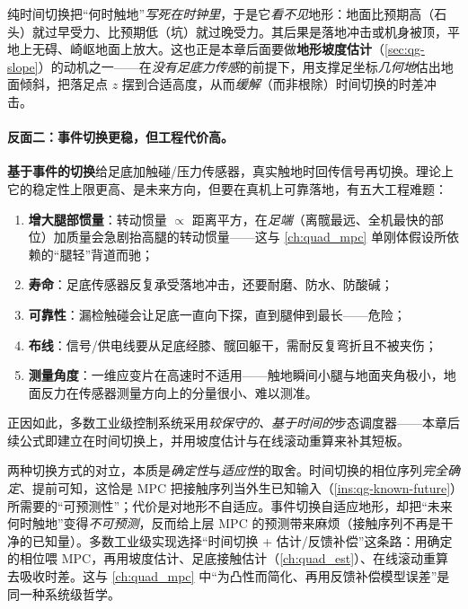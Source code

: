 \begin{pitfall}\label{pit:qg-time-switch}
纯时间切换把“何时触地”\emph{写死在时钟里}，于是它\emph{看不见}地形：地面比预期高（石头）就过早受力、比预期低（坑）就过晚受力。其后果是落地冲击或机身被顶，平地上无碍、崎岖地面上放大。这也正是本章后面要做\textbf{地形坡度估计}（\cref{sec:qg-slope}）的动机之一——在\emph{没有足底力传感}的前提下，用支撑足坐标\emph{几何地}估出地面倾斜，把落足点 $z$ 摆到合适高度，从而\emph{缓解}（而非根除）时间切换的时差冲击。
\end{pitfall}

\paragraph{反面二：事件切换更稳，但工程代价高。}
\textbf{基于事件的切换}给足底加触碰/压力传感器，真实触地时回传信号再切换。理论上它的稳定性上限更高、是未来方向，但要在真机上可靠落地，有五大工程难题\cite{yu2021quadruped}：
\begin{enumerate}
  \item \textbf{增大腿部惯量}：转动惯量 $\propto$ 距离平方，在\emph{足端}（离髋最远、全机最快的部位）加质量会急剧抬高腿的转动惯量——这与 \cref{ch:quad_mpc} 单刚体假设所依赖的“腿轻”背道而驰；
  \item \textbf{寿命}：足底传感器反复承受落地冲击，还要耐磨、防水、防酸碱；
  \item \textbf{可靠性}：漏检触碰会让足底一直向下探，直到腿伸到最长——危险；
  \item \textbf{布线}：信号/供电线要从足底经膝、髋回躯干，需耐反复弯折且不被夹伤；
  \item \textbf{测量角度}：一维应变片在高速时不适用——触地瞬间小腿与地面夹角极小，地面反力在传感器测量方向上的分量很小、难以测准。
\end{enumerate}
正因如此，多数工业级控制系统采用\emph{较保守的、基于时间的}步态调度器\cite{yu2021quadruped}——本章后续公式即建立在时间切换上，并用坡度估计与在线滚动重算来补其短板。

\begin{insight}\label{ins:qg-time-vs-event}
两种切换方式的对立，本质是\emph{确定性}与\emph{适应性}的取舍。时间切换的相位序列\emph{完全确定}、提前可知，这恰是 MPC 把接触序列当外生已知输入（\cref{ins:qg-known-future}）所需要的“可预测性”；代价是对地形不自适应。事件切换自适应地形，却把“未来何时触地”变得\emph{不可预测}，反而给上层 MPC 的预测带来麻烦（接触序列不再是干净的已知量）。多数工业级实现选择“时间切换 + 估计/反馈补偿”这条路：用确定的相位喂 MPC，再用坡度估计、足底接触估计（\cref{ch:quad_est}）、在线滚动重算去吸收时差。这与 \cref{ch:quad_mpc} 中“为凸性而简化、再用反馈补偿模型误差”是同一种系统级哲学。
\end{insight}

